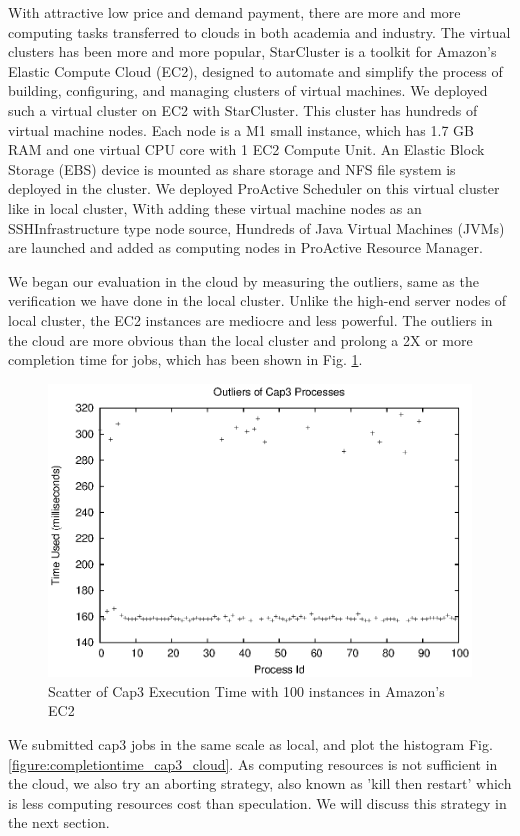 With attractive low price and demand payment, there are more and more computing tasks transferred to clouds in both academia and industry. The virtual clusters has been more and more popular, StarCluster \cite{starcluster} is a toolkit for Amazon’s Elastic Compute Cloud (EC2), designed to automate and simplify the process of building, configuring, and managing clusters of virtual machines. We deployed such a virtual cluster on EC2 with StarCluster. This cluster has hundreds of virtual machine nodes. Each node is a M1 small instance, which has 1.7 GB RAM and one virtual CPU core with 1 EC2 Compute Unit. An Elastic Block Storage (EBS) device is mounted as share storage and NFS file system is deployed in the cluster. We deployed ProActive Scheduler on this virtual cluster like in local cluster, With adding these virtual machine nodes as an SSHInfrastructure type node source, Hundreds of Java Virtual Machines (JVMs) are launched and added as computing nodes in ProActive Resource Manager.

We began our evaluation in the cloud by measuring the outliers, same as the verification we have done in the local cluster. Unlike the high-end server nodes of local cluster, the EC2 instances are mediocre and less powerful. The outliers in the cloud are more obvious than the local cluster and prolong a 2X or more completion time for jobs, which has been shown in Fig. \ref{figure:outlier_cloud}.

\begin{figure}
\centering
\includegraphics[width=0.9\columnwidth]{figures/cloud_outliers.eps}
\caption{Scatter of Cap3 Execution Time with 100 instances in Amazon's EC2}
\label{figure:outlier_cloud}
\end{figure}

We submitted cap3 jobs in the same scale as local, and plot the histogram Fig. \ref{figure:completiontime_cap3_cloud}. As computing resources is not sufficient in the cloud, we also try an aborting strategy, also known as 'kill then restart' which is less computing resources cost than speculation. We will discuss this strategy in the next section.

